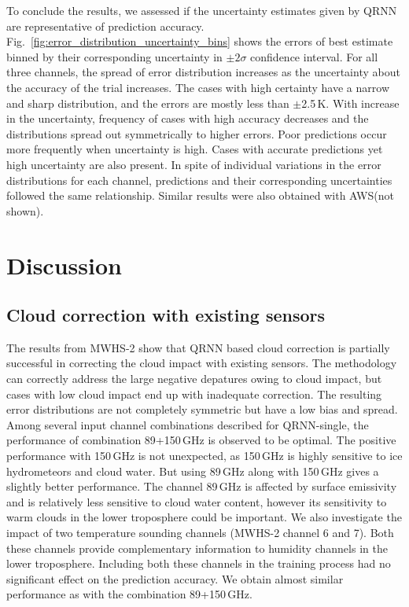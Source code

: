 \documentclass[amt]{copernicus}
\begin{document}
To conclude the results, we assessed if the uncertainty estimates given by QRNN are representative of prediction accuracy. Fig.~\ref{fig:error_distribution_uncertainty_bins} shows the errors of best estimate binned by their corresponding uncertainty in $\pm2\sigma$  confidence interval. For all three channels, the spread of error distribution increases as the uncertainty about the accuracy of the trial increases. The cases with high certainty have a narrow and sharp distribution, and the errors are mostly less than $\pm$2.5\,K. With increase in the uncertainty, frequency of cases with high accuracy decreases and the distributions spread out symmetrically to higher errors. Poor predictions occur more frequently when uncertainty is high. Cases with accurate predictions yet high uncertainty are also present. In spite of individual variations in the error distributions for each channel, predictions and their corresponding uncertainties followed the same relationship. Similar results were also obtained with AWS(not shown). 


\section{Discussion}

\subsection{Cloud correction with existing sensors}
%
The results from MWHS-2 show that QRNN based cloud correction is partially successful in correcting the cloud impact with existing sensors. The methodology can correctly address the large negative depatures owing to cloud impact, but cases with low cloud impact end up with inadequate correction. The resulting error distributions are not completely symmetric but have a low bias and spread. Among several input channel combinations described for QRNN-single, the performance of combination 89+150\,GHz is observed to be optimal. The positive performance with 150\,GHz is not unexpected, as 150\,GHz is highly sensitive to ice hydrometeors and cloud water. But using 89\,GHz along with 150\,GHz gives a slightly better performance. The channel 89\,GHz is affected by surface emissivity and is relatively less sensitive to cloud water content, however its sensitivity to warm clouds in the lower troposphere could be important. We also investigate the impact of two temperature sounding channels (MWHS-2 channel 6 and 7). Both these channels provide complementary information to humidity channels in the lower troposphere. Including both these channels in the training process had no significant effect on the prediction accuracy. We obtain almost similar performance as with the combination 89+150\,GHz. 
\end{document}
